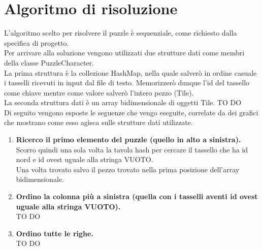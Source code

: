 % 
%
% 
%

\section{Algoritmo di risoluzione}
L'algoritmo scelto per risolvere il puzzle è sequenziale, come richiesto dalla specifica di progetto. \\
Per arrivare alla soluzione vengono utilizzati due strutture dati come membri della classe PuzzleCharacter. \\
La prima struttura è la collezione HashMap, nella quale salverò in ordine casuale i tasselli ricevuti in input dal file di testo. Memorizzerò dunque l'id del tassello come chiave mentre come valore salverò l'intero pezzo (Tile). \\
La seconda struttura dati è un array bidimensionale di oggetti Tile. TO DO\\
Di seguito vengono esposte le seguenze che vengo eseguite, correlate da dei grafici che mostrano come esso agisca sulle strutture dati utilizzate.

	\begin{enumerate}
		\item \textbf{Ricerco il primo elemento del puzzle (quello in alto a sinistra).} \\
Scorro quindi una sola volta la tavola hash per cercare il tassello che ha id nord e id ovest uguale alla stringa VUOTO. \\
Una volta trovato salvo il pezzo trovato nella prima posizione dell'array bidimensionale.

		\item \textbf{Ordino la colonna più a sinistra (quella con i tasselli aventi id ovest uguale alla stringa VUOTO).} \\
TO DO
		\item \textbf{Ordino tutte le righe.} \\
TO DO
	\end{enumerate}


